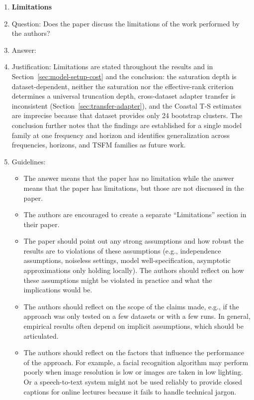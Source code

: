 \begin{enumerate}
\item {\bf Limitations}
    \item[] Question: Does the paper discuss the limitations of the work performed by the authors?
    \item[] Answer: \answerYes{}
    \item[] Justification: Limitations are stated throughout the results and in Section~\ref{sec:model-setup-cost} and the conclusion: the saturation depth is dataset-dependent, neither the saturation nor the effective-rank criterion determines a universal truncation depth, cross-dataset adapter transfer is inconsistent (Section~\ref{sec:transfer-adapter}), and the Coastal T-S estimates are imprecise because that dataset provides only 24 bootstrap clusters. The conclusion further notes that the findings are established for a single model family at one frequency and horizon and identifies generalization across frequencies, horizons, and TSFM families as future work.
    \item[] Guidelines:
    \begin{itemize}
        \item The answer \answerNA{} means that the paper has no limitation while the answer \answerNo{} means that the paper has limitations, but those are not discussed in the paper. 
        \item The authors are encouraged to create a separate ``Limitations'' section in their paper.
        \item The paper should point out any strong assumptions and how robust the results are to violations of these assumptions (e.g., independence assumptions, noiseless settings, model well-specification, asymptotic approximations only holding locally). The authors should reflect on how these assumptions might be violated in practice and what the implications would be.
        \item The authors should reflect on the scope of the claims made, e.g., if the approach was only tested on a few datasets or with a few runs. In general, empirical results often depend on implicit assumptions, which should be articulated.
        \item The authors should reflect on the factors that influence the performance of the approach. For example, a facial recognition algorithm may perform poorly when image resolution is low or images are taken in low lighting. Or a speech-to-text system might not be used reliably to provide closed captions for online lectures because it fails to handle technical jargon.

\end{itemize}
\end{enumerate}
